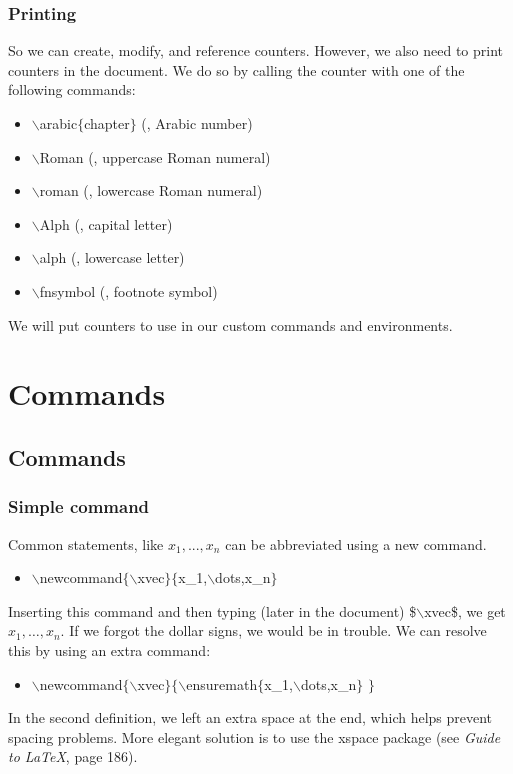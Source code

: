 \begin{frame}  \frametitle{Printing}
	So we can create, modify, and reference counters. However, we also need to print counters in the document. We do so by calling the counter with one of the following commands:
	\setcounter{temp}{4}
	\begin{itemize}
		\item[] {\color{command}$\backslash$arabic}{\color{braces}$\{${\color{black}chapter}$\}$} (, Arabic number)
		\item[] {\color{command}$\backslash$Roman} (, uppercase Roman numeral)
		\item[] {\color{command}$\backslash$roman} (, lowercase Roman numeral)
		\item[] {\color{command}$\backslash$Alph} (, capital letter)
		\item[] {\color{command}$\backslash$alph} (, lowercase letter)
		\item[] {\color{command}$\backslash$fnsymbol} (, footnote symbol)
	\end{itemize}
	We will put counters to use in our custom commands and environments.
\end{frame}

\section[Commands]{Commands}
\subsection[Commands]{Commands}

\begin{frame}  \frametitle{Simple command}
	\newcommand{\xvec}{x_1, \ldots, x_n}
	Common statements, like $x_1, ..., x_n$ can be abbreviated using a new command.
	\begin{itemize}
		\item[] {\color{command}$\backslash$newcommand\color{braces}$\{${\color{command}$\backslash$xvec}$\}\{${\color{black}x\_1,{\color{command}$\backslash$dots},x\_n}$\}$}
	\end{itemize}
	Inserting this command and then typing (later in the document) {\color{braces}\$\color{command}$\backslash$xvec\color{braces}\$}, we get $\xvec$. If we forgot the dollar signs, we would be in trouble. We can resolve this by using an extra command:
	\begin{itemize}
		\item[] {\color{command}$\backslash$newcommand\color{braces}$\{${\color{command}$\backslash$xvec}$\}\{${\color{command}$\backslash$ensuremath{\color{braces}$\{$}{\color{black}x\_1,{\color{command}$\backslash$dots},x\_n}}$\}$ $\}$}
	\end{itemize}
	In the second definition, we left an extra space at the end, which helps prevent spacing problems. More elegant solution is to use the {\color{highlight}xspace} package (see \textit{Guide to LaTeX}, page 186).
\end{frame}

